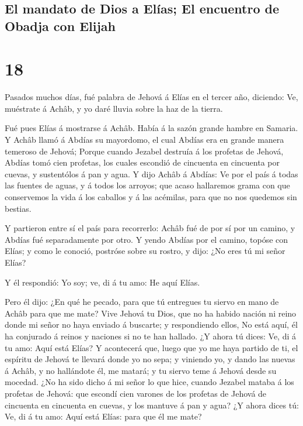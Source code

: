 \hypertarget{el-mandato-de-dios-a-eluxedas-el-encuentro-de-obadja-con-elijah}{%
\subsection{El mandato de Dios a Elías; El encuentro de Obadja con
Elijah}\label{el-mandato-de-dios-a-eluxedas-el-encuentro-de-obadja-con-elijah}}

\hypertarget{section-17}{%
\section{18}\label{section-17}}

 Pasados muchos días, fué palabra de Jehová á Elías en el
tercer año, diciendo: Ve, muéstrate á Achâb, y yo daré lluvia sobre la
haz de la tierra.

 Fué pues Elías á mostrarse á Achâb. Había á la sazón
grande hambre en Samaria.  Y Achâb llamó á Abdías su
mayordomo, el cual Abdías era en grande manera temeroso de Jehová;
 Porque cuando Jezabel destruía á los profetas de Jehová,
Abdías tomó cien profetas, los cuales escondió de cincuenta en cincuenta
por cuevas, y sustentólos á pan y agua.  Y dijo Achâb á
Abdías: Ve por el país á todas las fuentes de aguas, y á todos los
arroyos; que acaso hallaremos grama con que conservemos la vida á los
caballos y á las acémilas, para que no nos quedemos sin bestias.

 Y partieron entre sí el país para recorrerlo: Achâb fué
de por sí por un camino, y Abdías fué separadamente por otro.
 Y yendo Abdías por el camino, topóse con Elías; y como le
conoció, postróse sobre su rostro, y dijo: ¿No eres tú mi señor Elías?

 Y él respondió: Yo soy; ve, di á tu amo: He aquí Elías.

 Pero él dijo: ¿En qué he pecado, para que tú entregues tu
siervo en mano de Achâb para que me mate?  Vive Jehová tu
Dios, que no ha habido nación ni reino donde mi señor no haya enviado á
buscarte; y respondiendo ellos, No está aquí, él ha conjurado á reinos y
naciones si no te han hallado.  ¿Y ahora tú dices: Ve, di
á tu amo: Aquí está Elías?  Y acontecerá que, luego que
yo me haya partido de ti, el espíritu de Jehová te llevará donde yo no
sepa; y viniendo yo, y dando las nuevas á Achâb, y no hallándote él, me
matará; y tu siervo teme á Jehová desde su mocedad.  ¿No
ha sido dicho á mi señor lo que hice, cuando Jezabel mataba á los
profetas de Jehová: que escondí cien varones de los profetas de Jehová
de cincuenta en cincuenta en cuevas, y los mantuve á pan y agua?
 ¿Y ahora dices tú: Ve, di á tu amo: Aquí está Elías:
para que él me mate?

